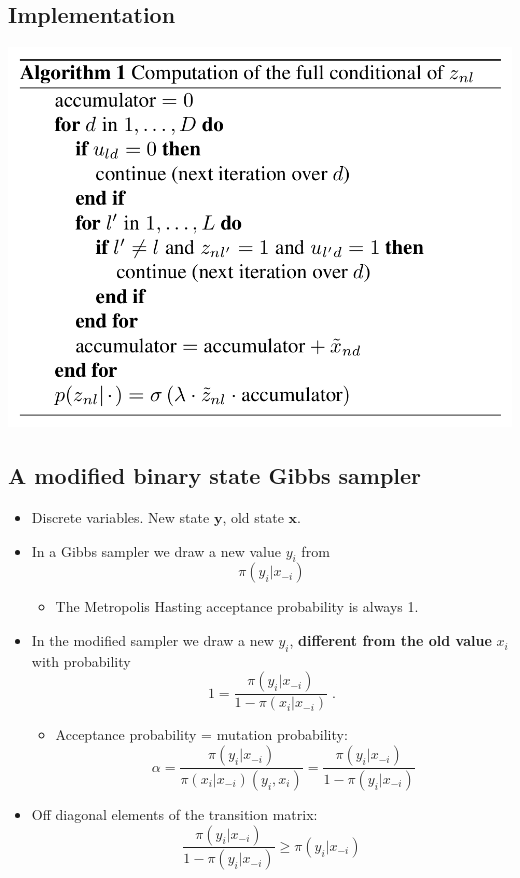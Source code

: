 \documentclass[11pt]{article}
\begin{document}
\subsection*{Implementation}
\label{sec-3-2}
\includegraphics[width=.9\linewidth]{./alg1_2.png}
\subsection*{A modified binary state Gibbs sampler}
\label{sec-3-3}
\begin{itemize}
\item Discrete variables. New state $\mathbf{y}$, old state $\mathbf{x}$.
\item In a Gibbs sampler we draw a new value $y_i$ from $$ \pi(y_i|x_{-i}) $$
\begin{itemize}
\item The Metropolis Hasting acceptance probability is always 1. $$ $$
\end{itemize}
\item In the modified sampler we draw a new  $y_i$, \textbf{different from the old value} $x_i$ with probability $$ 1 = \frac{\pi(y_i|x_{-i})}{1-\pi(x_i|x_{-i})}\;. $$
\begin{itemize}
\item Acceptance probability = mutation probability: $$\alpha=\frac{\pi(y_i|x_{-i})}{\pi(x_i|x_{-i})(y_i,x_i)} = \frac{\pi(y_i|x_{-i})}{1-\pi(y_i|x_{-i})} $$
\end{itemize}
\item Off diagonal elements of the transition matrix:
$$  \frac{\pi(y_i|x_{-i})}{1-\pi(y_i|x_{-i})} \ge \pi(y_i|x_{-i}) $$
\end{itemize}
\end{document}
